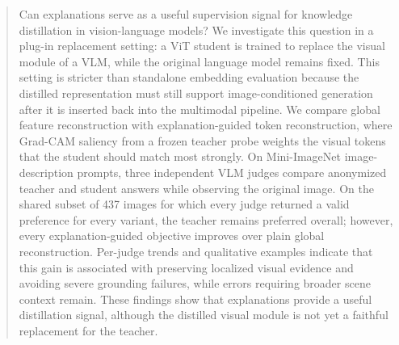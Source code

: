 \begin{abstract}
Can explanations serve as a useful supervision signal for knowledge distillation in vision-language models?
We investigate this question in a plug-in replacement setting: a ViT student is trained to replace the visual module of a VLM, while the original language model remains fixed.
This setting is stricter than standalone embedding evaluation because the distilled representation must still support image-conditioned generation after it is inserted back into the multimodal pipeline.
We compare global feature reconstruction with explanation-guided token reconstruction, where Grad-CAM saliency from a frozen teacher probe weights the visual tokens that the student should match most strongly.
On Mini-ImageNet image-description prompts, three independent VLM judges compare anonymized teacher and student answers while observing the original image.
On the shared subset of 437 images for which every judge returned a valid preference for every variant, the teacher remains preferred overall; however, every explanation-guided objective improves over plain global reconstruction.
Per-judge trends and qualitative examples indicate that this gain is associated with preserving localized visual evidence and avoiding severe grounding failures, while errors requiring broader scene context remain.
These findings show that explanations provide a useful distillation signal, although the distilled visual module is not yet a faithful replacement for the teacher.
\end{abstract}
